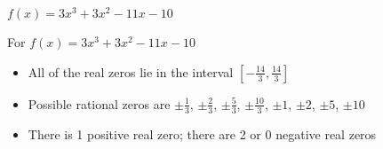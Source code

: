 {$f(x) = 3x^{3} + 3x^{2} - 11x - 10$}
{ For   $f(x) = 3x^{3} + 3x^{2} - 11x - 10$
\begin{itemize}
\item  All of the real zeros lie in the interval $\left[-\frac{14}{3},\frac{14}{3}\right]$
\item  Possible rational zeros are $\pm \frac{1}{3}$, $\pm \frac{2}{3}$, $\pm \frac{5}{3}$, $\pm \frac{10}{3}$, $\pm 1$, $\pm 2$, $\pm 5$, $\pm 10$
\item  There is 1 positive real zero;  there are 2 or 0 negative real zeros
\end{itemize}
}
